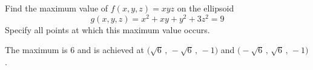 \begin{question}[M200 2011A] %
Find the maximum value of $f (x, y, z) = xyz$ on the ellipsoid 
\begin{equation*}
g(x, y, z) = x^2 + xy + y^2 + 3z^2 = 9
\end{equation*}
Specify all points at which this maximum 
value occurs.
\end{question}

%

\begin{answer}
 The maximum is $6$ and is achieved at 
$\big(\sqrt{6}\,,\,-\sqrt{6}\,,\,-1\big)$ and 
$\big(-\sqrt{6}\,,\,\sqrt{6}\,,\,-1\big)$.
\end{answer}

